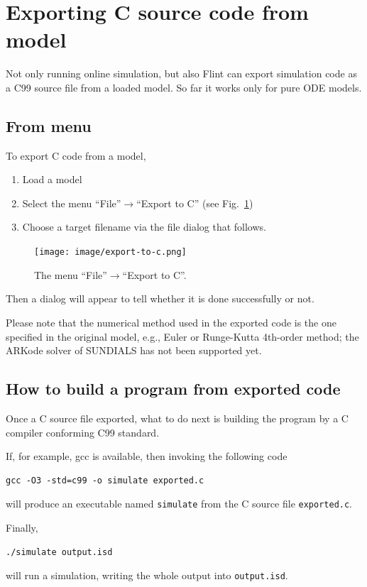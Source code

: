 \documentclass[a4paper,10pt]{report}
\begin{document}
\section{Exporting C source code from model}
\label{sec:orgfe4a063}
Not only running online simulation, but also Flint can export simulation code
as a C99 source file from a loaded model. So far it works only for pure ODE models.

\subsection{From menu}
\label{sec:orgb85628b}
To export C code from a model,

\begin{enumerate}
\item Load a model
\item Select the menu ``File''\(\to\)``Export to C'' (see Fig.~\ref{fig:org67bcb02})
\item Choose a target filename via the file dialog that follows.
\end{enumerate}

\begin{figure}[htbp]
\centering
\texttt{[image: image/export-to-c.png]}
\caption{\label{fig:org67bcb02}The menu ``File''\(\to\)``Export to C''.}
\end{figure}

Then a dialog will appear to tell whether it is done successfully or not.

Please note that the numerical method used in the exported code is the one
specified in the original model, e.g., Euler or Runge-Kutta 4th-order method;
the ARKode solver of SUNDIALS has not been supported yet.

\subsection{How to build a program from exported code}
\label{sec:orgfa750c7}
Once a C source file exported, what to do next is building the program by a C compiler
conforming C99 standard.

If, for example, gcc is available, then invoking the following code
\begin{verbatim}
gcc -O3 -std=c99 -o simulate exported.c
\end{verbatim}
will produce an executable named \texttt{simulate} from the C source file \texttt{exported.c}.

Finally,
\begin{verbatim}
./simulate output.isd
\end{verbatim}
will run a simulation, writing the whole output into \texttt{output.isd}.
\end{document}
